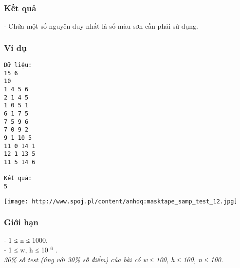 \subsubsection{   Kết quả  }

   - Chứa một số nguyên duy nhất là số màu sơn cần phải sử dụng.  

\subsubsection{   Ví dụ  }
\begin{verbatim}
Dữ liệu:
15 6
10
1 4 5 6
2 1 4 5
1 0 5 1
6 1 7 5
7 5 9 6
7 0 9 2
9 1 10 5
11 0 14 1
12 1 13 5
11 5 14 6

Kết quả:
5
\end{verbatim}
\texttt{[image: http://www.spoj.pl/content/anhdq:masktape\_samp\_test\_12.jpg]}

\subsubsection{   Giới hạn  }

   - 1 ≤ n ≤ 1000.   
\\   - 1 ≤ w, h ≤ 10   $^    6   $   .   
\\\textit{     30\% số test (ứng với 30\% số điểm) của bài có  w ≤ 100, h ≤ 100, n ≤ 100.    }